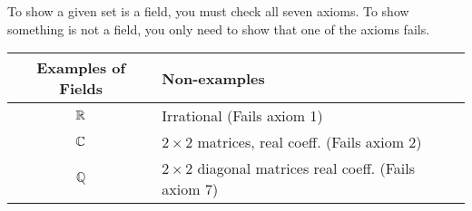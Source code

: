 \vspace*{.2cm}
To show a given set is a field, you must check all seven axioms. To show something is not a field, you only need to show that one of the axioms fails.      
\vspace*{.2cm}

\begin{center}
\begin{tabular}{|c|l|}
\hline
Examples of Fields& Non-examples \\ \hline
$\mathbb R$ & Irrational (Fails axiom 1) \\ \hline
$\mathbb C$ & $2\times2$ matrices, real coeff. (Fails axiom 2) \\ \hline
$\mathbb{Q}$ & $2\times2$ diagonal matrices real coeff. (Fails axiom 7) \\ \hline
\end{tabular}
\end{center}

\vspace*{,2cm}

